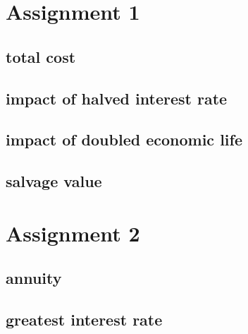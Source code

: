 \documentclass{article}
\begin{document}
\section{Assignment 1}
\subsection{total cost}
\subsection{impact of halved interest rate}
\subsection{impact of doubled economic life}
\subsection{salvage value}
\section{Assignment 2}
\subsection{annuity}
\subsection{greatest interest rate}
\end{document}
